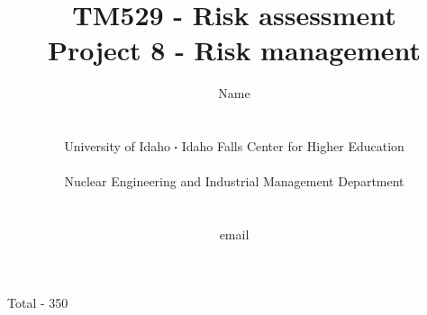 \documentclass[11pt,a4paper]{article}
\newcommand*\sq{\mathbin{\vcenter{\hbox{\rule{.3ex}{.3ex}}}}} %
\begin{document}
\begin{titlepage}
    \title{
        TM529 - Risk assessment\\
        Project 8 - Risk management\\
    }
    \author{
        Name
        \\ \\ \\
        University of Idaho $\sq$ Idaho Falls Center for Higher Education
        \\ \\
        Nuclear Engineering and Industrial Management Department
        \\ \\ \\
        email 
    }
\clearpage %
\maketitle
\vspace*{\fill}
\begin{flushright}{
        Total - 350 
}
\end{flushright}
\thispagestyle{empty} %
\end{titlepage}
\end{document}
